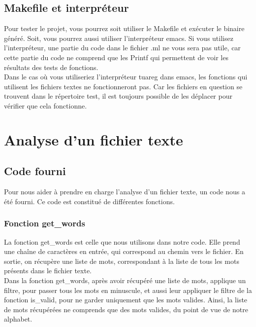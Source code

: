 \documentclass[a4paper, title page, 12pt]{report}
\begin{document}
	\newpage
		
	\section{Makefile et interpréteur}
	Pour tester le projet, vous pourrez soit utiliser le Makefile et exécuter le binaire généré. Soit, vous pourrez aussi utiliser l'interpréteur emacs. Si vous utilisez l'interpréteur, une partie du code dans le fichier .ml ne vous sera pas utile, car cette partie du code ne comprend que les Printf qui permettent de voir les résultats des tests de fonctions.\\
	
	Dans le cas où vous utiliseriez l'interpréteur tuareg dans emacs, les fonctions qui utilisent les fichiers textes ne fonctionneront pas. Car les fichiers en question se trouvent dans le répertoire test, il est toujours possible de les déplacer pour vérifier que cela fonctionne.
	 
	\newpage

	\chapter{Analyse d'un fichier texte}
	\section{Code fourni}
	Pour nous aider à prendre en charge l'analyse d'un fichier texte, un code nous a été fourni. Ce code est constitué de différentes fonctions.
	
	\subsection{Fonction get\_words}
	La fonction get\_words est celle que nous utilisons dans notre code. Elle prend une chaîne de caractères en entrée, qui correspond au chemin vers le fichier. En sortie, on récupère une liste de mots, correspondant à la liste de tous les mots présents dans le fichier texte. \\
	
	Dans la fonction get\_words, après avoir récupéré une liste de mots, applique un filtre, pour passer tous les mots en minuscule, et aussi leur appliquer le filtre de la fonction is\_valid, pour ne garder uniquement que les mots valides. Ainsi, la liste de mots récupérées ne comprends que des mots valides, du point de vue de notre alphabet.\\
	
\end{document}
